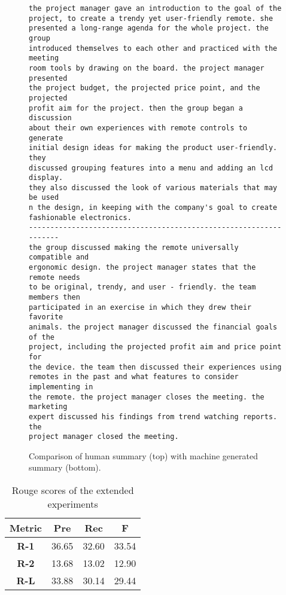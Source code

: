 \begin{figure}[h]
\begin{lstlisting}[numbers=none]
the project manager gave an introduction to the goal of the
project, to create a trendy yet user-friendly remote. she
presented a long-range agenda for the whole project. the group
introduced themselves to each other and practiced with the meeting
room tools by drawing on the board. the project manager presented
the project budget, the projected price point, and the projected
profit aim for the project. then the group began a discussion
about their own experiences with remote controls to generate
initial design ideas for making the product user-friendly. they
discussed grouping features into a menu and adding an lcd display.
they also discussed the look of various materials that may be used 
n the design, in keeping with the company's goal to create
fashionable electronics. 
------------------------------------------------------------------
the group discussed making the remote universally compatible and
ergonomic design. the project manager states that the remote needs
to be original, trendy, and user - friendly. the team members then
participated in an exercise in which they drew their favorite
animals. the project manager discussed the financial goals of the
project, including the projected profit aim and price point for
the device. the team then discussed their experiences using
remotes in the past and what features to consider implementing in
the remote. the project manager closes the meeting. the marketing
expert discussed his findings from trend watching reports. the
project manager closed the meeting. 
\end{lstlisting}
\caption{Comparison of human summary (top) with machine generated summary (bottom).}
\label{fig:extended-experiment-example}
\end{figure}

\begin{table}[h]
\centering
\begin{tabular}{@{}clll@{}}
\toprule
\textbf{Metric} & \multicolumn{1}{c}{\textbf{Pre}} & \multicolumn{1}{c}{\textbf{Rec}} & \multicolumn{1}{c}{\textbf{F}} \\ \midrule
\textbf{R-1}    & 36.65                           & 32.60                           & 33.54                         \\
\textbf{R-2}    & 13.68                           & 13.02                           & 12.90                         \\
\textbf{R-L}    & 33.88                           & 30.14                           & 29.44                         \\ \bottomrule
\end{tabular}
\caption{Rouge scores of the extended experiments}
\label{tab:extended-experiment-rouge}
\end{table}

